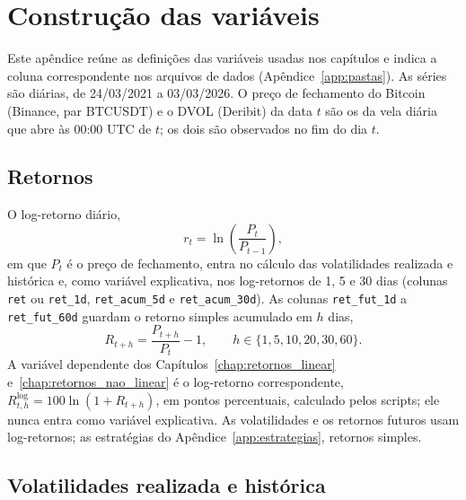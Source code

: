 \chapter{Construção das variáveis}
\label{app:variaveis}

Este apêndice reúne as definições das variáveis usadas nos capítulos e indica
a coluna correspondente nos arquivos de dados (Apêndice~\ref{app:pastas}). As
séries são diárias, de 24/03/2021 a 03/03/2026. O preço de fechamento do
Bitcoin (Binance, par BTCUSDT) e o DVOL (Deribit) da data $t$ são os da vela
diária que abre às 00:00 UTC de $t$; os dois são observados no fim do dia $t$.

\section{Retornos}

O log-retorno diário,
\[
r_t = \ln\left(\frac{P_t}{P_{t-1}}\right),
\]
em que $P_t$ é o preço de fechamento, entra no cálculo das volatilidades
realizada e histórica e, como variável explicativa, nos log-retornos de 1, 5 e 30 dias
(colunas \texttt{ret} ou \texttt{ret\_1d}, \texttt{ret\_acum\_5d} e
\texttt{ret\_acum\_30d}). As colunas \texttt{ret\_fut\_1d} a
\texttt{ret\_fut\_60d} guardam o retorno simples acumulado em $h$ dias,
\[
R_{t+h} = \frac{P_{t+h}}{P_t} - 1, \qquad h \in \{1, 5, 10, 20, 30, 60\}.
\]
A variável dependente dos Capítulos~\ref{chap:retornos_linear}
e~\ref{chap:retornos_nao_linear} é o log-retorno correspondente,
$R^{\log}_{t,h} = 100\ln(1 + R_{t+h})$, em pontos percentuais, calculado pelos
scripts; ele nunca entra como variável explicativa. As volatilidades e os
retornos futuros usam log-retornos; as estratégias do
Apêndice~\ref{app:estrategias}, retornos simples.

\section{Volatilidades realizada e histórica}

